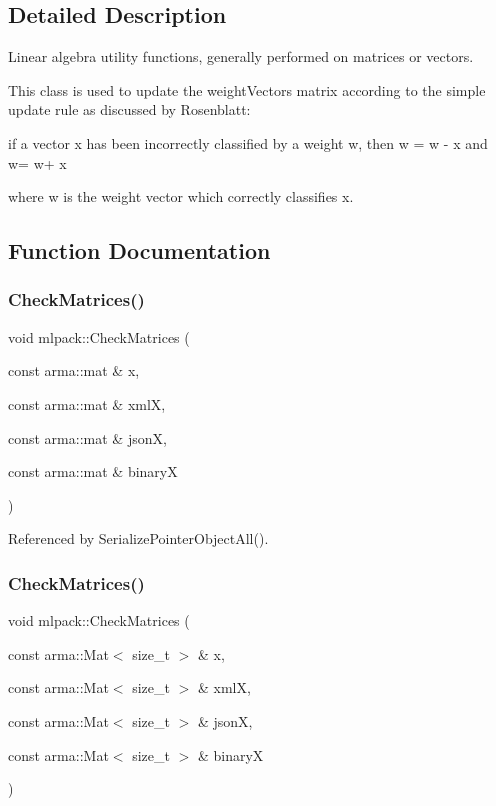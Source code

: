 \subsection{Detailed Description}
Linear algebra utility functions, generally performed on matrices or vectors. 

This class is used to update the weight\+Vectors matrix according to the simple update rule as discussed by Rosenblatt\+:

if a vector x has been incorrectly classified by a weight w, then w = w -\/ x and w\textquotesingle{}= w\textquotesingle{}+ x

where w\textquotesingle{} is the weight vector which correctly classifies x. 

\subsection{Function Documentation}
\mbox{\label{namespacemlpack_aa79e1de3de2187b74e5ea138b09ab461}} 
\subsubsection{Check\+Matrices()\hspace{0.1cm}{\footnotesize\ttfamily [1/3]}}
{\footnotesize\ttfamily void mlpack\+::\+Check\+Matrices (\begin{DoxyParamCaption}\item[{const arma\+::mat \&}]{x,  }\item[{const arma\+::mat \&}]{xmlX,  }\item[{const arma\+::mat \&}]{jsonX,  }\item[{const arma\+::mat \&}]{binaryX }\end{DoxyParamCaption})}



Referenced by Serialize\+Pointer\+Object\+All().

\mbox{\label{namespacemlpack_a58b18b5a75135c9cf5f7e90dd626f7ae}} 
\subsubsection{Check\+Matrices()\hspace{0.1cm}{\footnotesize\ttfamily [2/3]}}
{\footnotesize\ttfamily void mlpack\+::\+Check\+Matrices (\begin{DoxyParamCaption}\item[{const arma\+::\+Mat$<$ size\+\_\+t $>$ \&}]{x,  }\item[{const arma\+::\+Mat$<$ size\+\_\+t $>$ \&}]{xmlX,  }\item[{const arma\+::\+Mat$<$ size\+\_\+t $>$ \&}]{jsonX,  }\item[{const arma\+::\+Mat$<$ size\+\_\+t $>$ \&}]{binaryX }\end{DoxyParamCaption})}

